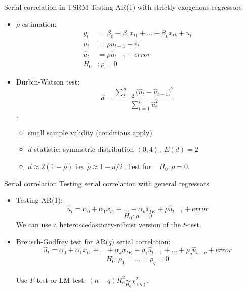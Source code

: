 \documentclass{beamer}
\begin{document}
\begin{frame}{Serial correlation in TSRM}
Testing AR(1) with strictly exogenous regressors\\ \medskip
\begin{itemize}
\item $\rho$ estimation:
\begin{align}\nonumber
y_t & = \beta_0+\beta_1 x_{t1}+\dots+\beta_k x_{tk}+u_t \\ \nonumber
u_t & = \rho u_{t-1} + e_t \\ \nonumber
\hat{u}_t &= \rho \hat{u}_{t-1}+error \\ \nonumber
H_0 & : \rho=0 \nonumber
\end{align}
\item Durbin-Watson test: $$d = \frac{\sum \limits^n_{t=2} \big(\hat{u}_t - \hat{u}_{t-1}\big)^2}{\sum \limits^n_{t=1}\hat{u}^2_t}$$.
\begin{itemize}
\item small sample validity (conditions apply)\\
\item $d$-statistic: symmetric distribution $\left\langle 0,4 \right\rangle, \> E(d)=2$
\item $ d \approx 2(1-\hat{\rho}) $    i.e.   $\hat{\rho} \approx 1-d/2$. Test for: \ $ H_0: \rho=0$.
\end{itemize}
\end{itemize}
\end{frame}
\begin{frame}{Serial correlation}
Testing serial correlation with general regressors\\ \medskip
\begin{itemize}
\item Testing AR(1):
$$\hat{u}_t=\alpha_0+\alpha_1 x_{t1} + \dots + \alpha_k x_{tK} + \rho \hat{u}_{t-1} + \textit{error}$$
$$H_0 : \rho = 0$$
We can use a heteroscedasticity-robust version of the $t$-test.\\ \bigskip
\item Breusch-Godfrey test for AR($q$) serial correlation:
$$\hat{u}_t=\alpha_0+\alpha_1 x_{t1} + \dots + \alpha_k x_{tK} + \rho_1 \hat{u}_{t-1} +\dots+ \rho_q \hat{u}_{t-q}+\textit{error}  $$
$$H_0 : \rho_1 = \dots = \rho_q = 0$$ \\ \medskip
Use $F$-test \quad or \quad LM-test: $(n-q)R_a^2 \underset{H_0}{\sim} \chi^2_{(q)}$.
\end{itemize}
\end{frame}
\end{document}
